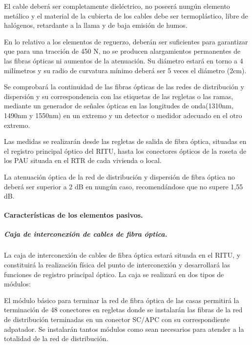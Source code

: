 El cable deberá ser completamente dieléctrico, no poseerá nungún elemento metálico y el material de la cubierta de los cables debe ser termoplástico, libre de halógenos, retardante a la llama y de baja emisión de humos.

En lo relativo a los elementos de reguerzo, deberán ser suficientes para garantizar que para una tracción de 450 N, no se producen alargamientos permanentes de las fibras ópticas ni aumentos de la atenuación. Su diámetro estará en torno a 4 milímetros y su radio de curvatura mínimo deberá ser 5 veces el diámetro (2cm).

Se comprobará la continuidad de las fibras ópticas de las redes de distribución y dispersión y su correspondencia con las etiquetas de las regletas o las ramas, mediante un generador de señales ópticas en las longitudes de onda(1310nm, 1490nm y 1550nm) en un extremo y un detector o medidor adecuado en el otro extremo.

Las medidas se realizarán desde las regletas de salida de fibra óptica, situadas en el registro principal óptico del RITU, hasta los conectores ópticos de la roseta de los PAU situada en el RTR de cada vivienda o local.

La atenuación óptica de la red de distribución y dispersión de fibra óptica no deberá ser superior a 2 dB en nungún caso, recomendándose que no supere 1,55 dB.
\paragraph{Características de los elementos pasivos.}
\subparagraph{Caja de interconexión de cables de fibra óptica.}
La caja de interconexión de cables de fibra óptica estará situada en el RITU, y constituirá la realización física del punto de interconexión y desarrollará las funciones de registro principal óptico. La caja se realizará en dos tipos de módulos:

El módulo básico para terminar la red de fibra óptica de las casas permitirá la terminación de 48 conectores en regletas donde se instalarán las fibras de la red de distribución terminadas en un conector SC/APC con su correspondiente adpatador. Se instalarán tantos módulos como sean necesarios para atender a la totalidad de la red de distribución.

